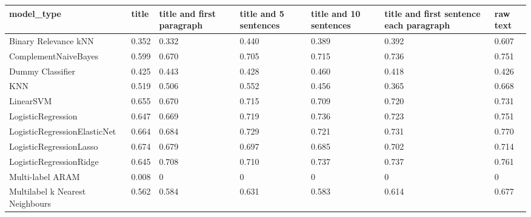 \begin{tabular}{lllllll}
\toprule
                     model\_type & title & title and first paragraph & title and 5 sentences & title and 10 sentences & title and first sentence each paragraph & raw text \\
\midrule
           Binary Relevance kNN & 0.352 &                     0.332 &                 0.440 &                  0.389 &                                   0.392 &    0.607 \\
           ComplementNaiveBayes & 0.599 &                     0.670 &                 0.705 &                  0.715 &                                   0.736 &    0.751 \\
               Dummy Classifier & 0.425 &                     0.443 &                 0.428 &                  0.460 &                                   0.418 &    0.426 \\
                            KNN & 0.519 &                     0.506 &                 0.552 &                  0.456 &                                   0.365 &    0.668 \\
                      LinearSVM & 0.655 &                     0.670 &                 0.715 &                  0.709 &                                   0.720 &    0.731 \\
             LogisticRegression & 0.647 &                     0.669 &                 0.719 &                  0.736 &                                   0.723 &    0.751 \\
   LogisticRegressionElasticNet & 0.664 &                     0.684 &                 0.729 &                  0.721 &                                   0.731 &    0.770 \\
        LogisticRegressionLasso & 0.674 &                     0.679 &                 0.697 &                  0.685 &                                   0.702 &    0.714 \\
        LogisticRegressionRidge & 0.645 &                     0.708 &                 0.710 &                  0.737 &                                   0.737 &    0.761 \\
               Multi-label ARAM & 0.008 &                         0 &                     0 &                      0 &                                       0 &        0 \\
Multilabel k Nearest Neighbours & 0.562 &                     0.584 &                 0.631 &                  0.583 &                                   0.614 &    0.677 \\

\end{tabular}
